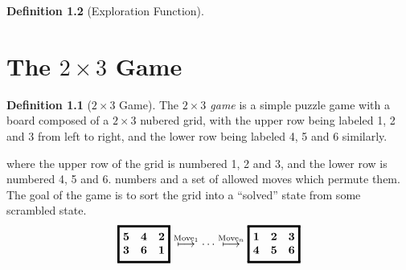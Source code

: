 \documentclass[a4paper,twoside,12pt,openany]{report}
\theoremstyle{plain}
\theoremstyle{definition}
\newtheorem{definition}{Definition}
\newtheorem{example}{Example}
\theoremstyle{remark}
\begin{document}
\begin{definition}[Exploration Function]

\chapter{The \(2\times 3\) Game}


\begin{definition}[\(2\times 3\) Game]
The \emph{\(2\times 3\) game} is a simple puzzle game with a board composed of a \(2\times 3\) nubered grid, with the upper row being labeled 1, 2 and 3 from left to right, and the lower row being labeled 4, 5 and 6 similarly.

where the upper row of the grid is numbered 1, 2 and 3, and the lower row is numbered 4, 5  and 6. numbers and a set of allowed moves which permute them. The goal of the game is to sort the grid into a ``solved'' state from some scrambled state.
\[
	\gameboard[5 4 2 3 6 1]
	\overset{\text{Move}_1}\gamemovearrow
	\cdots
	\overset{\text{Move}_n}\gamemovearrow
	\gameboard[1 2 3 4 5 6]
\]
\end{definition}


\end{definition}
\end{document}
